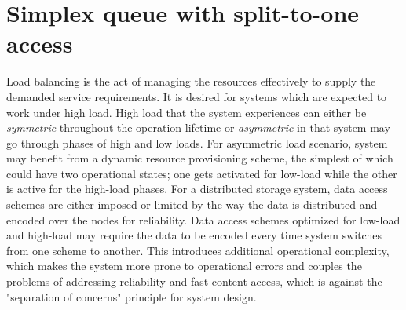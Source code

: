 \documentclass[sigconf,draft]{acmart}
\begin{document}
\section{Simplex queue with split-to-one access}
\label{sec:sec_simplex_split_to_one}
Load balancing is the act of managing the resources effectively to supply the demanded service requirements. It is desired for systems which are expected to work under high load. High load that the system experiences can either be \emph{symmetric} throughout the operation lifetime or \emph{asymmetric} in that system may go through phases of high and low loads. For asymmetric load scenario, system may benefit from a dynamic resource provisioning scheme, the simplest of which could have two operational states; one gets activated for low-load while the other is active for the high-load phases. For a distributed storage system, data access schemes are either imposed or limited by the way the data is distributed and encoded over the nodes for reliability. Data access schemes optimized for low-load and high-load may require the data to be encoded every time system switches from one scheme to another. This introduces additional operational complexity, which makes the system more prone to operational errors and couples the problems of addressing reliability and fast content access, which is against the "separation of concerns" principle for system design.
\end{document}
